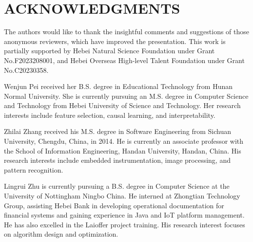 \documentclass[journal]{IEEEtran}
\begin{document}
\section{ACKNOWLEDGMENTS}
The authors would like to thank the insightful comments and suggestions of those anonymous reviewers, which have improved the presentation.
This work is partially supported by Hebei Natural Science Foundation under Grant No.F2023208001, and Hebei Overseas High-level Talent Foundation under Grant No.C20230358.



\vspace{-25pt} 
\begin{IEEEbiographynophoto}{Wenjun Pei}
received her B.S. degree in Educational Technology from Hunan Normal University. She is currently pursuing an M.S. degree in Computer Science and Technology from Hebei University of Science and Technology. Her research interests include feature selection, causal learning, and interpretability.
\end{IEEEbiographynophoto}
\vspace{-25pt} 
\begin{IEEEbiographynophoto}{Zhilai Zhang}
received his M.S. degree in Software Engineering from Sichuan University, Chengdu, China, in 2014. He is currently an associate professor with the School of Information Engineering, Handan University, Handan, China. His research interests include embedded instrumentation, image processing, and pattern recognition.
\end{IEEEbiographynophoto}
\vspace{-25pt} 
\begin{IEEEbiographynophoto}{Lingrui Zhu}
is currently pursuing a B.S. degree in Computer Science at the University of Nottingham Ningbo China. He interned at Zhongtian Technology Group, assisting Hebei Bank in developing operational documentation for financial systems and gaining experience in Java and IoT platform management. He has also excelled in the Laioffer project training. His research interest focuses on algorithm design and optimization.
\end{IEEEbiographynophoto}
\end{document}
